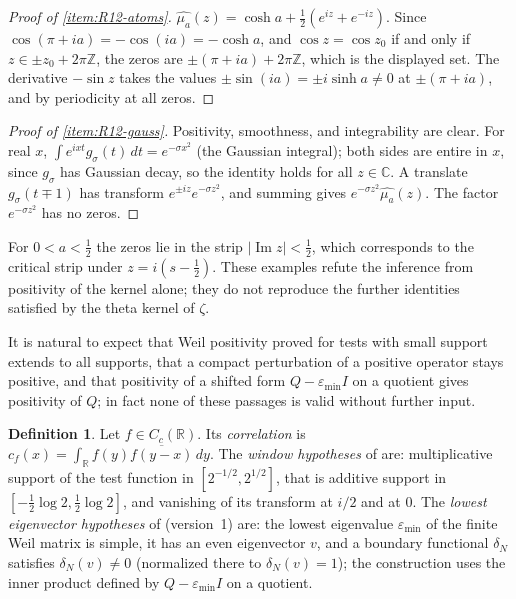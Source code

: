 \documentclass[11pt]{amsart}
\theoremstyle{plain}
\theoremstyle{definition}
\newtheorem{definition}[theorem]{Definition}
\theoremstyle{remark}
\numberwithin{equation}{section}
\newcommand{\C}{\mathbb{C}}
\newcommand{\R}{\mathbb{R}}
\newcommand{\Z}{\mathbb{Z}}
\DeclareMathOperator{\Ima}{Im}
\renewcommand{\Im}{\Ima}
\begin{document}
\begin{proof}[Proof of \ref{item:R12-atoms}]
$\widehat{\mu_a}(z)=\cosh a+\tfrac12(e^{iz}+e^{-iz})$. Since
$\cos(\pi+ia)=-\cos(ia)=-\cosh a$, and $\cos z=\cos z_0$ if and only if
$z\in\pm z_0+2\pi\Z$, the zeros are $\pm(\pi+ia)+2\pi\Z$, which is the
displayed set. The derivative $-\sin z$ takes the values
$\pm\sin(ia)=\pm i\sinh a\ne0$ at $\pm(\pi+ia)$, and by periodicity at
all zeros.
\end{proof}

\begin{proof}[Proof of \ref{item:R12-gauss}]
Positivity, smoothness, and integrability are clear. For real $x$,
$\int e^{ixt}g_\sigma(t)\,dt=e^{-\sigma x^2}$ (the Gaussian integral);
both sides are entire in $x$, since $g_\sigma$ has Gaussian decay, so the
identity holds for all $z\in\C$. A translate $g_\sigma(t\mp1)$ has
transform $e^{\pm iz}e^{-\sigma z^2}$, and summing gives
$e^{-\sigma z^2}\widehat{\mu_a}(z)$. The factor $e^{-\sigma z^2}$ has no
zeros.
\end{proof}

For $0<a<\tfrac12$ the zeros lie in the strip $|\Im z|<\tfrac12$, which
corresponds to the critical strip under $z=i(s-\tfrac12)$. These
examples refute the inference from positivity of the kernel alone; they
do not reproduce the further identities satisfied by the theta kernel of
$\zeta$.

It is natural to expect that Weil positivity proved for tests with small
support extends to all supports, that a compact perturbation of a
positive operator stays positive, and that positivity of a shifted form
$Q-\varepsilon_{\min}I$ on a quotient gives positivity of $Q$; in fact
none of these passages is valid without further input.

\begin{definition}\label{def:R14-sources}
Let $f\in C_c(\R)$. Its \emph{correlation} is
$c_f(x)=\int_\R f(y)\overline{f(y-x)}\,dy$. The \emph{window
hypotheses} of \cite[Theorem~1]{ConnesConsani2020WeilPositivity} are:
multiplicative support of the test function in $[2^{-1/2},2^{1/2}]$,
that is additive support in $[-\tfrac12\log2,\tfrac12\log2]$, and
vanishing of its transform at $i/2$ and at $0$. The \emph{lowest
eigenvector hypotheses} of
\cite[Theorem~5.10]{ConnesConsaniMoscovici2025ZetaTriples} (version~1)
are: the lowest eigenvalue $\varepsilon_{\min}$ of the
finite Weil matrix is simple, it has an even eigenvector $v$, and a
boundary functional $\delta_N$ satisfies $\delta_N(v)\ne0$ (normalized
there to $\delta_N(v)=1$); the construction uses the inner product
defined by $Q-\varepsilon_{\min}I$ on a quotient.
\end{definition}
\end{document}
